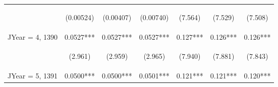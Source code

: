 \documentclass{standalone}
\begin{document}
\begin{tabular}{lcccccc}
    \vspace{4pt}     & \begin{footnotesize}(0.00524)\end{footnotesize} & \begin{footnotesize}(0.00407)\end{footnotesize} & \begin{footnotesize}(0.00740)\end{footnotesize} & \begin{footnotesize}(7.564)\end{footnotesize}  & \begin{footnotesize}(7.529)\end{footnotesize}  & \begin{footnotesize}(7.508)\end{footnotesize}  \\
    JYear = 4, 1390  & 0.0527***                                       & 0.0527***                                       & 0.0527***                                       & 0.127***                                       & 0.126***                                       & 0.126***                                       \\
    \vspace{4pt}     & \begin{footnotesize}(2.961)\end{footnotesize}   & \begin{footnotesize}(2.959)\end{footnotesize}   & \begin{footnotesize}(2.965)\end{footnotesize}   & \begin{footnotesize}(7.940)\end{footnotesize}  & \begin{footnotesize}(7.881)\end{footnotesize}  & \begin{footnotesize}(7.843)\end{footnotesize}  \\
    JYear = 5, 1391  & 0.0500***                                       & 0.0500***                                       & 0.0501***                                       & 0.121***                                       & 0.121***                                       & 0.120***                                       \\

\end{tabular}
\end{document}
